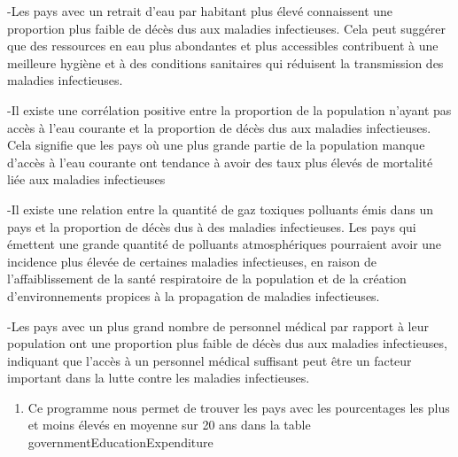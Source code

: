 \documentclass[
]{article}
\providecommand{\tightlist}{%
  \setlength{\itemsep}{0pt}\setlength{\parskip}{0pt}}
\begin{document}
-Les pays avec un retrait d'eau par habitant plus élevé connaissent une
proportion plus faible de décès dus aux maladies infectieuses. Cela peut
suggérer que des ressources en eau plus abondantes et plus accessibles
contribuent à une meilleure hygiène et à des conditions sanitaires qui
réduisent la transmission des maladies infectieuses.

-Il existe une corrélation positive entre la proportion de la population
n'ayant pas accès à l'eau courante et la proportion de décès dus aux
maladies infectieuses. Cela signifie que les pays où une plus grande
partie de la population manque d'accès à l'eau courante ont tendance à
avoir des taux plus élevés de mortalité liée aux maladies infectieuses

-Il existe une relation entre la quantité de gaz toxiques polluants émis
dans un pays et la proportion de décès dus à des maladies infectieuses.
Les pays qui émettent une grande quantité de polluants atmosphériques
pourraient avoir une incidence plus élevée de certaines maladies
infectieuses, en raison de l'affaiblissement de la santé respiratoire de
la population et de la création d'environnements propices à la
propagation de maladies infectieuses.

-Les pays avec un plus grand nombre de personnel médical par rapport à
leur population ont une proportion plus faible de décès dus aux maladies
infectieuses, indiquant que l'accès à un personnel médical suffisant
peut être un facteur important dans la lutte contre les maladies
infectieuses.

\begin{enumerate}
\def\labelenumi{\alph{enumi})}
\tightlist
\item
  Ce programme nous permet de trouver les pays avec les pourcentages les
  plus et moins élevés en moyenne sur 20 ans dans la table
  governmentEducationExpenditure
\end{enumerate}
\end{document}
